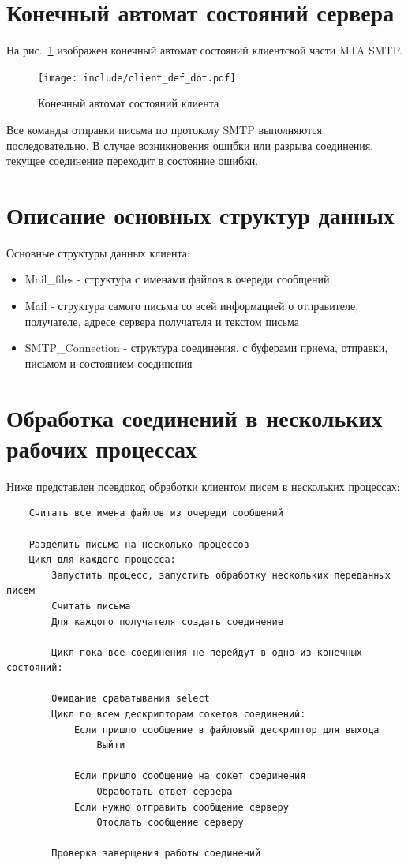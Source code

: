 \documentclass[a4paper,12pt]{report}
\begin{document}
\section{Конечный автомат состояний сервера}

На рис.~\ref{fig:fsm} изображен конечный автомат состояний клиентской части MTA SMTP. 

\begin{figure}[h]
    \centering
    \texttt{[image: include/client\_def\_dot.pdf]}
    \caption{Конечный автомат состояний клиента}
    \label{fig:fsm}
\end{figure}

Все команды отправки письма по протоколу SMTP выполняются последовательно. В случае возникновения ошибки или разрыва соединения, текущее соединение переходит в состояние ошибки.

\section{Описание основных структур данных}

 Основные структуры данных клиента:
\begin{itemize}
    \item Mail\_files - структура с именами файлов в очереди сообщений
    \item Mail - структура самого письма со всей информацией о отправителе, получателе, адресе сервера получателя и текстом письма
    \item SMTP\_Connection - структура соединения, с буферами приема, отправки, письмом и состоянием соединения
\end{itemize}

\section{Обработка соединений в нескольких рабочих процессах}

Ниже представлен псевдокод обработки клиентом писем в нескольких процессах:

\begin{verbatim}
    Считать все имена файлов из очереди сообщений

    Разделить письма на несколько процессов
    Цикл для каждого процесса:
        Запустить процесс, запустить обработку нескольких переданных писем
        Считать письма
        Для каждого получателя создать соединение

        Цикл пока все соединения не перейдут в одно из конечных состояний:

        Ожидание срабатывания select
        Цикл по всем дескрипторам сокетов соединений:
            Если пришло сообщение в файловый дескриптор для выхода
                Выйти

            Если пришло сообщение на сокет соединения
                Обработать ответ сервера
            Если нужно отправить сообщение серверу
                Отослать сообщение серверу

        Проверка заверщения работы соединений
    
\end{verbatim}
\end{document}
